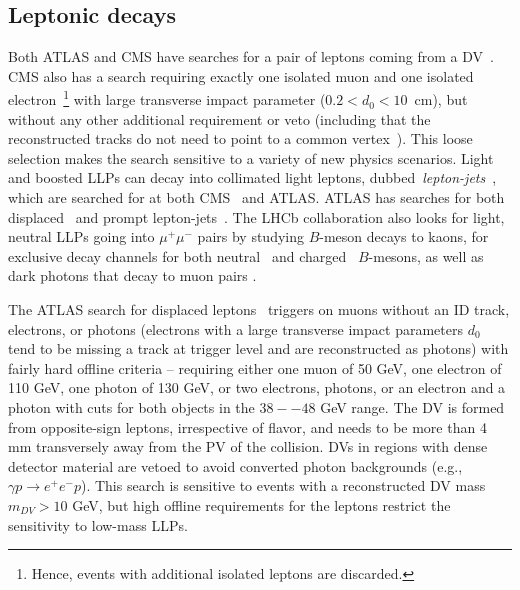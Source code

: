 \subsection{Leptonic decays}
\label{subsec:dleptons}

Both ATLAS and CMS have searches for a pair of leptons coming from a DV~\cite{Aad:2015rba,CMS:2014hka,CMS:2015pca}. CMS also has a search requiring exactly one isolated muon and one isolated electron~\footnote{Hence, events with additional isolated leptons are discarded.} with large transverse impact parameter ($0.2 < d_{0} < 10$~cm), but without any other additional requirement or veto (including that the reconstructed tracks do not need to point to a common vertex~\cite{CMS-PAS-EXO-16-022}). This loose selection makes the search sensitive to a variety of new physics scenarios. Light and boosted LLPs can decay into collimated light leptons, dubbed~\emph{lepton-jets}~\cite{ArkaniHamed:2008qp}, which are searched for at both CMS~\cite{Khachatryan:2015wka} and ATLAS.  ATLAS has searches for both displaced~\cite{Aad:2014yea,ATLAS-CONF-2016-042} and prompt lepton-jets~\cite{Aad:2015sms}.  The LHCb collaboration also looks for light, neutral LLPs going into $\mu^+ \mu^-$ pairs by studying $B$-meson decays to kaons, for exclusive decay channels for both neutral~\cite{Aaij:2015tna} and charged~\cite{Aaij:2016qsm} $B$-mesons, as well as dark photons that decay to muon pairs \cite{Aaij:2017rft}. 

The ATLAS search for displaced leptons~\cite{Aad:2015rba} triggers on muons without an ID track, electrons, or photons (electrons with a large transverse impact parameters $d_0$ tend to be missing a track at trigger level and are reconstructed as photons) with fairly hard offline \pT criteria -- requiring either one muon of 50 GeV, one electron of 110 GeV, one photon of 130 GeV, or two electrons, photons, or an electron and a photon with \pT cuts for both objects in the $38--48$ GeV range.  The DV is formed from opposite-sign leptons, irrespective of flavor, and needs to be more than 4 mm transversely away from the PV of the collision.  DVs in regions with dense detector material are vetoed to avoid converted photon backgrounds (e.g., $\gamma p\to e^+ e^-p$).  This search is sensitive to events with a reconstructed DV mass $m_{DV}>10$ GeV, but high offline \pT requirements for the leptons restrict the sensitivity to low-mass LLPs.

